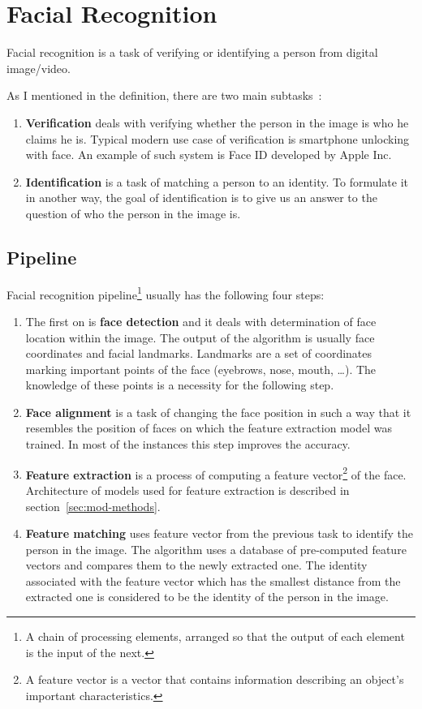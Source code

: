 \chapter{Facial Recognition}\label{ch:face-rec}
Facial recognition is a task of verifying or identifying a person from digital image/video.

As I mentioned in the definition, there are two main subtasks~\cite{FaceRec}:
\begin{enumerate}
    \item \textbf{Verification} deals with verifying whether the person in the image is who he claims he is.
    Typical modern use case of verification is smartphone unlocking with face.
    An example of such system is Face ID developed by Apple Inc.

    \item \textbf{Identification} is a task of matching a person to an identity.
    To formulate it in another way, the goal of identification is to give us an answer to the question of who the person
    in the image is.
\end{enumerate}

\section{Pipeline}\label{sec:pipeline}

Facial recognition pipeline\footnote{A chain of processing elements, arranged so that the output of each element is the
input of the next.} usually has the following four steps:
\begin{enumerate}
    \item The first on is \textbf{face detection} and it deals with determination of face location within the image.
    The output of the algorithm is usually face coordinates and facial landmarks.
    Landmarks are a set of coordinates marking important points of the face (eyebrows, nose, mouth, \ldots).
    The knowledge of these points is a necessity for the following step.
    \item \textbf{Face alignment} is a task of changing the face position in such a way that it resembles the position
    of faces on which the feature extraction model was trained.
    In most of the instances this step improves the accuracy.
    \item \textbf{Feature extraction} is a process of computing a feature vector\footnote{A feature vector is a vector
    that contains information describing an object's important characteristics.} of the face.
    Architecture of models used for feature extraction is described in section~\ref{sec:mod-methods}.
    \item \textbf{Feature matching} uses feature vector from the previous task to identify the person in the image.
    The algorithm uses a database of pre-computed feature vectors and compares them to the newly extracted one.
    The identity associated with the feature vector which has the smallest distance from the extracted one is
    considered to be the identity of the person in the image.
\end{enumerate}


